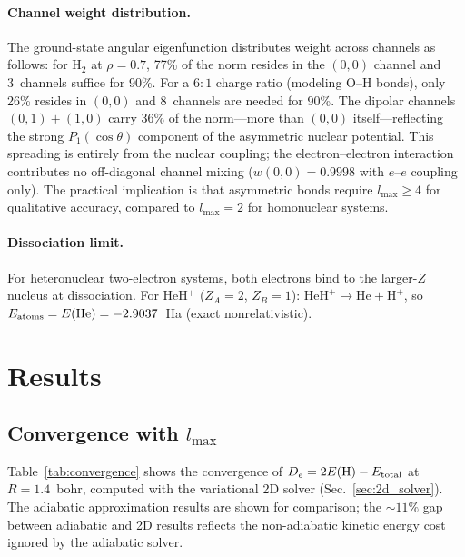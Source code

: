 \documentclass[aps,pra,twocolumn,superscriptaddress,longbibliography]{revtex4-2}
\begin{document}
\paragraph{Channel weight distribution.}
The ground-state angular eigenfunction distributes weight across
channels as follows: for H$_2$ at $\rho = 0.7$, 77\% of the norm
resides in the $(0{,}0)$ channel and 3~channels suffice for 90\%.
For a $6{:}1$ charge ratio (modeling O--H bonds), only 26\% resides
in $(0{,}0)$ and 8~channels are needed for 90\%.  The dipolar
channels $(0{,}1) + (1{,}0)$ carry 36\% of the norm---more than
$(0{,}0)$ itself---reflecting the strong $P_1(\cos\theta)$ component
of the asymmetric nuclear potential.  This spreading is entirely
from the nuclear coupling; the electron--electron interaction
contributes no off-diagonal channel mixing ($w(0{,}0) = 0.9998$ with
$e$--$e$ coupling only).  The practical implication is that
asymmetric bonds require $l_{\max} \ge 4$ for qualitative accuracy,
compared to $l_{\max} = 2$ for homonuclear systems.

\paragraph{Dissociation limit.}
For heteronuclear two-electron systems, both electrons bind to the
larger-$Z$ nucleus at dissociation.  For HeH$^+$
($Z_A = 2$, $Z_B = 1$): $\text{HeH}^+ \to \text{He} + \text{H}^+$,
so $E_{\rm atoms} = E(\text{He}) = -2.9037$~Ha (exact
nonrelativistic).

\section{Results}
\label{sec:results}

\subsection{Convergence with \texorpdfstring{$l_{\max}$}{l\_max}}

Table~\ref{tab:convergence} shows the convergence of
$D_e = 2E(\text{H}) - E_{\rm total}$ at $R = 1.4$~bohr, computed
with the variational 2D solver (Sec.~\ref{sec:2d_solver}).
The adiabatic approximation results are shown for comparison; the
${\sim}11\%$ gap between adiabatic and 2D results reflects the
non-adiabatic kinetic energy cost ignored by the adiabatic solver.
\end{document}
